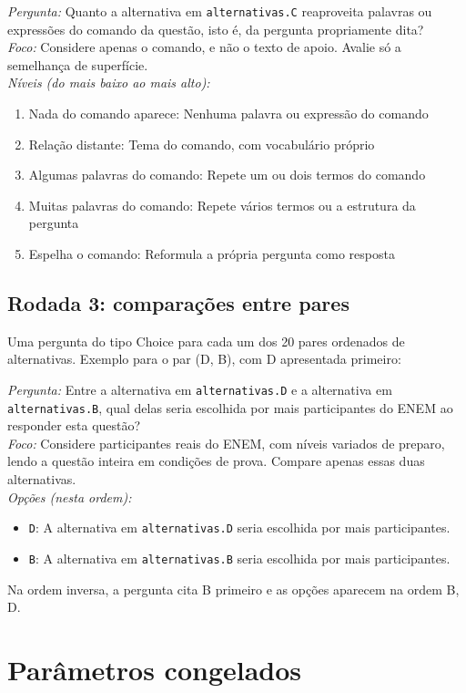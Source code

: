 \textit{Pergunta:} Quanto a alternativa em \texttt{alternativas.C} reaproveita palavras ou expressões do comando da questão, isto é, da pergunta propriamente dita?\\
\textit{Foco:} Considere apenas o comando, e não o texto de apoio. Avalie só a semelhança de superfície.\\
\textit{Níveis (do mais baixo ao mais alto):}
\begin{enumerate}[nosep,label=\arabic*.,start=0]
  \item Nada do comando aparece: Nenhuma palavra ou expressão do comando
  \item Relação distante: Tema do comando, com vocabulário próprio
  \item Algumas palavras do comando: Repete um ou dois termos do comando
  \item Muitas palavras do comando: Repete vários termos ou a estrutura da pergunta
  \item Espelha o comando: Reformula a própria pergunta como resposta
\end{enumerate}

\subsection{Rodada 3: comparações entre pares}

Uma pergunta do tipo Choice para cada um dos 20 pares ordenados de alternativas. Exemplo para o par (D, B), com D apresentada primeiro:

\textit{Pergunta:} Entre a alternativa em \texttt{alternativas.D} e a alternativa em \texttt{alternativas.B}, qual delas seria escolhida por mais participantes do ENEM ao responder esta questão?\\
\textit{Foco:} Considere participantes reais do ENEM, com níveis variados de preparo, lendo a questão inteira em condições de prova. Compare apenas essas duas alternativas.\\
\textit{Opções (nesta ordem):}
\begin{itemize}[nosep]
  \item \texttt{D}: A alternativa em \texttt{alternativas.D} seria escolhida por mais participantes.
  \item \texttt{B}: A alternativa em \texttt{alternativas.B} seria escolhida por mais participantes.
\end{itemize}
Na ordem inversa, a pergunta cita B primeiro e as opções aparecem na ordem B, D.

\section{Parâmetros congelados}\label{ap:parametros}

